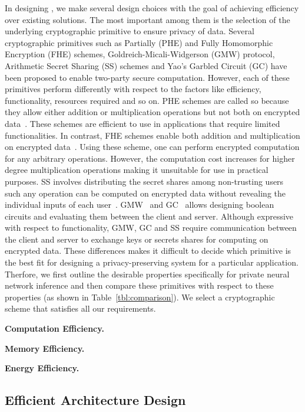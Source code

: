 

In designing \method, we make several design choices with the goal of achieving efficiency over existing solutions. The most important among them is the selection of the underlying cryptographic primitive to ensure privacy of data.
Several cryptographic primitives such as Partially (PHE) and Fully Homomorphic Encryption (FHE) schemes, Goldreich-Micali-Widgerson (GMW) protocol, Arithmetic Secret Sharing (SS) schemes and Yao's Garbled Circuit (GC) have been proposed to enable two-party secure computation. However, each of these primitives perform differently with respect to the factors like efficiency, functionality, resources required and so on. PHE schemes are called so because they allow either addition or multiplication operations but not both on encrypted data~\cite{paillier1999public,elgamal1985public}. These schemes are efficient to use in applications that require limited functionalities. In contrast, FHE schemes enable both addition and multiplication on encrypted data~\cite{gentry,full-hom,van2010fully,brakerski2011fully}. Using these scheme, one can perform encrypted computation for any arbitrary operations. However, the computation cost increases for higher degree multiplication operations making it unsuitable for use in practical purposes. SS involves distributing the  secret shares among non-trusting users such any operation can be computed on encrypted data without revealing the individual inputs of each user~\cite{beaver1991efficient}.  GMW~\cite{goldreich1987play} and GC~\cite{yao1982protocols} allows designing boolean circuits and evaluating them between the client and server. Although expressive with respect to functionality, GMW, GC and SS require communication between the client and server to exchange keys or secrets shares for computing on encrypted data.
These differences makes it difficult to decide which primitive is the best fit for designing a privacy-preserving system for a particular application.
Therfore, we first outline the desirable properties specifically for private neural network inference and then compare these primitives with respect to these properties (as shown in Table~\ref{tbl:comparison}). We select a cryptographic scheme that satisfies all our requirements.


\noindent\textbf{Computation Efficiency.}

\noindent\textbf{Memory Efficiency.}

\noindent\textbf{Energy Efficiency.}


\subsection{Efficient Architecture Design}

